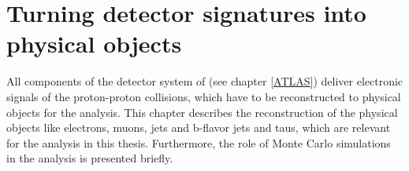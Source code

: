 \chapter{Turning detector signatures into physical objects}\label{detectorsignatures}
All components of the detector system of {\ATLAS} (see chapter \ref{ATLAS}) deliver electronic signals of the proton-proton collisions, which have to be reconstructed to physical objects for the analysis. This chapter describes the reconstruction of the physical objects like electrons, muons, jets and b-flavor jets and taus, which are relevant for the analysis in this thesis. Furthermore, the role of Monte Carlo simulations in the analysis is presented briefly.
